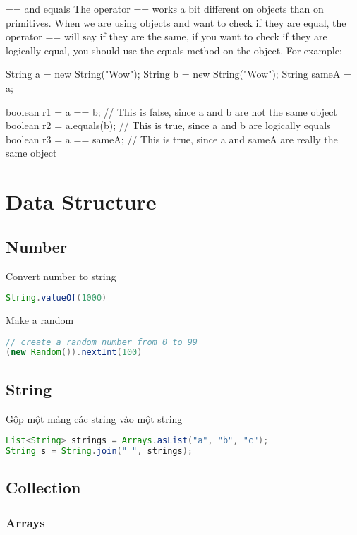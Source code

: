 == and equals
The operator == works a bit different on objects than on primitives. When we are using objects and want to check if they are equal, the operator == will say if they are the same, if you want to check if they are logically equal, you should use the equals method on the object. For example:

String a = new String("Wow");
String b = new String("Wow");
String sameA = a;

boolean r1 = a == b;      // This is false, since a and b are not the same object
boolean r2 = a.equals(b); // This is true, since a and b are logically equals
boolean r3 = a == sameA;  // This is true, since a and sameA are really the same object

\chapter{Data Structure}

\section{Number}

Convert number to string

\begin{lstlisting}[language=Java]
String.valueOf(1000)
\end{lstlisting}

Make a random

\begin{lstlisting}[language=Java]
// create a random number from 0 to 99
(new Random()).nextInt(100)
\end{lstlisting}


\section{String}

Gộp một mảng các string vào một string


\begin{lstlisting}[language=Java]
List<String> strings = Arrays.asList("a", "b", "c");
String s = String.join(" ", strings);
\end{lstlisting}

\section{Collection}

\subsection{Arrays}

